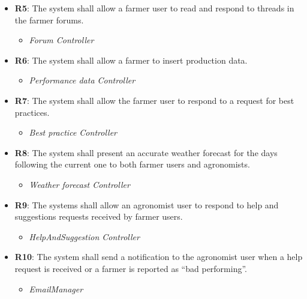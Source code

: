 \documentclass{article}
\begin{document}
\begin{itemize}
        \item \textbf{R5}: The system shall allow a farmer user to read and respond to threads in the farmer forums.
            \begin{itemize}
                \item \textit{Forum Controller}
            \end{itemize}
            
        \item \textbf{R6}: The system shall allow a farmer to insert production data.
            \begin{itemize}
                \item \textit{Performance data Controller}
            \end{itemize}

        \item \textbf{R7}: The system shall allow the farmer user to respond to a request for best practices.
            \begin{itemize}
                \item \textit{Best practice Controller}
            \end{itemize}
        
        \item \textbf{R8}: The system shall present an accurate weather forecast for the days following the current one to both farmer users and agronomists.
            \begin{itemize}
                \item \textit{Weather forecast Controller}
            \end{itemize}
            
        \item \textbf{R9}: The systems shall allow an agronomist user to respond to help and suggestions requests received by farmer users.
            \begin{itemize}
                \item \textit{HelpAndSuggestion Controller}
            \end{itemize}
        
        \item \textbf{R10}: The system shall send a notification to the agronomist user when a help request is received or a farmer is reported as “bad performing”.
            \begin{itemize}
                \item \textit{EmailManager}
            \end{itemize}
            

\end{itemize}
\end{document}
